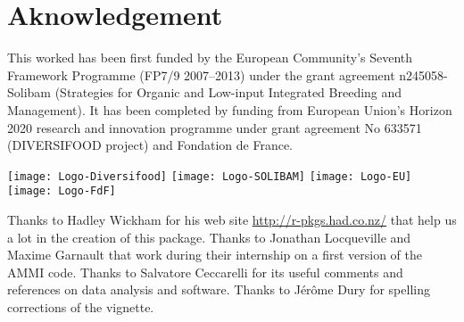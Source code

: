 
\chapter*{Aknowledgement} 
This worked has been first funded by the European Community’s Seventh Framework Programme (FP7/9 2007–2013) under the grant agreement n245058-Solibam (Strategies for Organic and Low-input Integrated Breeding and Management).
It has been completed by funding from European Union’s Horizon 2020 research and innovation programme under grant agreement No 633571 (DIVERSIFOOD project) and Fondation de France.


\begin{center}
\texttt{[image: Logo-Diversifood]} \hspace{.5cm}
\texttt{[image: Logo-SOLIBAM]} \hspace{.5cm}
\texttt{[image: Logo-EU]} \hspace{.5cm}
\texttt{[image: Logo-FdF]}
\end{center}

Thanks to Hadley Wickham for his web site \url{http://r-pkgs.had.co.nz/} that help us a lot in the creation of this package.
Thanks to Jonathan Locqueville and Maxime Garnault that work during their internship on a first version of the AMMI code.
Thanks to Salvatore Ceccarelli for its useful comments and references on data analysis and software.
Thanks to Jérôme Dury for spelling corrections of the vignette.


